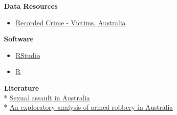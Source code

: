 \documentclass[11pt,a4paper,]{article}
\providecommand{\tightlist}{%
  \setlength{\itemsep}{0pt}\setlength{\parskip}{0pt}}
\begin{document}
\textbf{Data Resources}

\begin{itemize}
\tightlist
\item
  \href{https://www.abs.gov.au/statistics/people/crime-and-justice/recorded-crime-victims/latest-release}{Recorded Crime - Victims, Australia}
\end{itemize}

\textbf{Software}

\begin{itemize}
\tightlist
\item
  \href{http://www.rstudio.com/}{RStudio}\\
\item
  \href{https://www.R-project.org/}{R}
\end{itemize}

\textbf{Literature}\\
* \href{https://www.aihw.gov.au/getmedia/0375553f-0395-46cc-9574-d54c74fa601a/aihw-fdv-5.pdf.aspx?inline=true}{Sexual assault in Australia}\\
* \href{https://www.aic.gov.au/publications/tbp/tbp7}{An exploratory analysis of armed robbery in Australia}

\printbibliography
\end{document}
